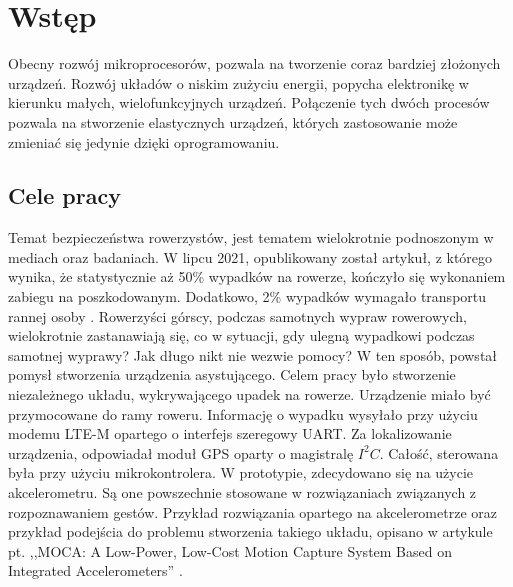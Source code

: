 \chapter{Wstęp}
\label{cha:wstep}

Obecny rozwój mikroprocesorów, pozwala na tworzenie coraz bardziej złożonych urządzeń. Rozwój układów o niskim zużyciu energii, popycha elektronikę w kierunku małych, wielofunkcyjnych urządzeń. Połączenie tych dwóch procesów pozwala na stworzenie elastycznych urządzeń, których zastosowanie może zmieniać się jedynie dzięki oprogramowaniu.


\section{Cele pracy}
\label{sec:celePracy}
Temat bezpieczeństwa rowerzystów, jest tematem wielokrotnie podnoszonym w mediach oraz badaniach. W lipcu 2021, opublikowany został artykuł, z którego wynika, że statystycznie aż 50\% wypadków na rowerze, kończyło się wykonaniem zabiegu na poszkodowanym. Dodatkowo, 2\% wypadków wymagało transportu rannej osoby \cite{collisions}.
Rowerzyści górscy, podczas samotnych wypraw rowerowych, wielokrotnie zastanawiają się, co w sytuacji, gdy ulegną wypadkowi podczas samotnej wyprawy?
Jak długo nikt nie wezwie pomocy? W ten sposób, powstał pomysł stworzenia urządzenia asystującego.
\newline
Celem pracy było stworzenie niezależnego układu, wykrywającego upadek na rowerze. Urządzenie miało być przymocowane do ramy roweru. Informację o wypadku wysyłało przy użyciu modemu LTE-M opartego o interfejs szeregowy UART. Za lokalizowanie urządzenia, odpowiadał moduł GPS oparty o magistralę $I^{2}C$. Całość, sterowana była przy użyciu mikrokontrolera. W prototypie, zdecydowano się na użycie akcelerometru. Są one powszechnie stosowane w rozwiązaniach związanych z rozpoznawaniem gestów. Przykład rozwiązania opartego na akcelerometrze oraz przykład podejścia do problemu stworzenia takiego układu, opisano w artykule pt. ,,MOCA: A Low-Power, Low-Cost Motion Capture System Based on Integrated Accelerometers'' \cite{moca_acc}.

